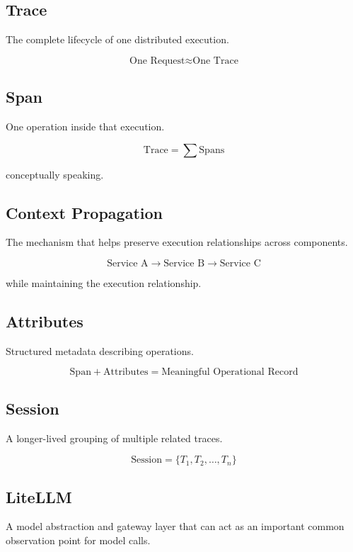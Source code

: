 \documentclass[11pt,a4paper]{article}
\begin{document}
\subsection*{Trace}

The complete lifecycle of one distributed execution.

\[
\text{One Request} \approx \text{One Trace}
\]

\subsection*{Span}

One operation inside that execution.

\[
\text{Trace} = \sum \text{Spans}
\]

conceptually speaking.

\subsection*{Context Propagation}

The mechanism that helps preserve execution relationships across components.

\[
\text{Service A} \rightarrow \text{Service B} \rightarrow \text{Service C}
\]

while maintaining the execution relationship.

\subsection*{Attributes}

Structured metadata describing operations.

\[
\text{Span} + \text{Attributes} = \text{Meaningful Operational Record}
\]

\subsection*{Session}

A longer-lived grouping of multiple related traces.

\[
\text{Session} = \{T_1,T_2,\ldots,T_n\}
\]

\subsection*{LiteLLM}

A model abstraction and gateway layer that can act as an important common observation point for model calls.
\end{document}
